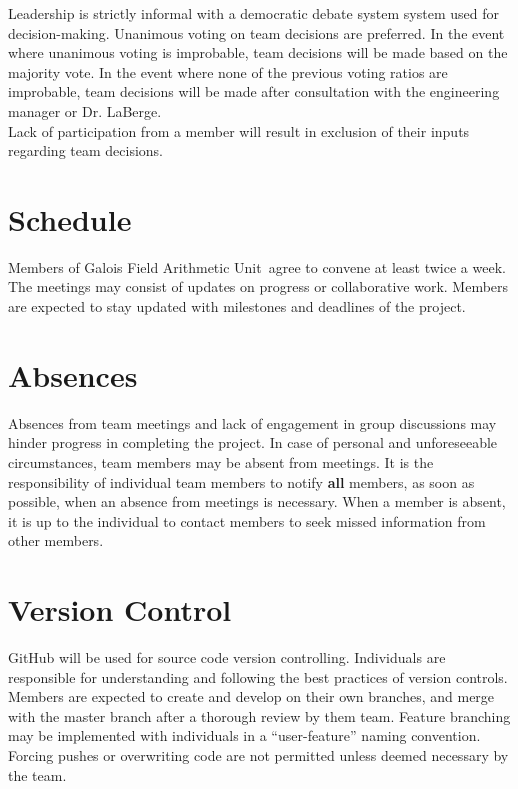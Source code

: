 \documentclass[paper=usletter, fontsize=12pt]{article}
\newcommand{\team}{Galois Field Arithmetic Unit}
\begin{document}
        Leadership is strictly informal with a democratic debate system system used for decision-making. Unanimous voting on team decisions are preferred. In the event where unanimous voting is improbable, team decisions will be made based on the majority vote. In the event where none of the previous voting ratios are improbable, team decisions will be made after consultation with the engineering manager or Dr. LaBerge. \\

        Lack of participation from a member will result in exclusion of their inputs regarding team decisions. 

    \section{Schedule}

        Members of \team \ agree to convene at least twice a week. The meetings may consist of updates on progress or collaborative work. Members are expected to stay updated with milestones and deadlines of the project.

    \section{Absences}

        Absences from team meetings and lack of engagement in group discussions may hinder progress in completing the project. In case of personal and unforeseeable circumstances, team members may be absent from meetings. It is the responsibility of individual team members to notify \textbf{all} members, as soon as possible, when an absence from meetings is necessary. When a member is absent, it is up to the individual to contact members to seek missed information from other members.

    \section{Version Control}

        GitHub will be used for source code version controlling. Individuals are responsible for understanding and following the best practices of version controls. Members are expected to create and develop on their own branches, and merge with the master branch after a thorough review by them team. Feature branching may be implemented with individuals in a “user-feature” naming convention. Forcing pushes or overwriting code are not permitted unless deemed necessary by the team.
\end{document}
